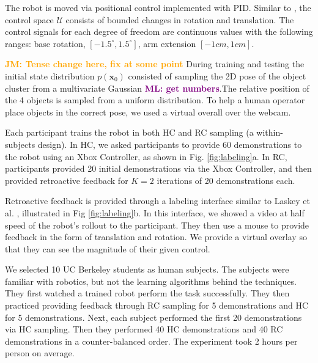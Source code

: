 \documentclass[10pt, conference]{ieeeconf}      %
\newcommand{\bx}{\mathbf{x}}
\newcommand{\mlnote}[1]{\ifthenelse{ \boolean{include-notes}}%
 {\textcolor{purple}{\textbf{ML: #1}}}{}}
\newcommand{\jmnote}[1]{\ifthenelse{ \boolean{include-notes}}%
 {\textcolor{orange}{\textbf{JM: #1}}}{}}
\begin{document}
The robot is moved via positional control implemented with PID. Similar to \cite{laskeyshiv}, the control space $\mathcal{U}$ consists of bounded changes in rotation and translation. The control signals for each degree of freedom are continuous values with the following ranges: base rotation, $[-1.5^\circ,1.5^\circ]$, arm extension $[-1cm,1cm]$.

\jmnote{Tense change here, fix at some point}
During training and testing the initial state distribution $p(\bx_0)$ consisted of sampling the 2D pose of the object cluster from a multivariate Gaussian \mlnote{get numbers}.The relative position of the 4 objects is sampled from a uniform distribution. To help a human operator place objects in the correct pose, we used a virtual overall over the webcam.   

Each participant trains the robot in both HC and RC sampling (a within-subjects design). In HC, we asked participants to provide 60 demonstrations to the robot using an Xbox Controller, as shown in Fig. \ref{fig:labeling}a. In RC, participants provided 20 initial demonstrations via the Xbox Controller, and then provided retroactive feedback for $K=2$ iterations of 20 demonstrations each.

Retroactive feedback is provided through a labeling interface similar to Laskey et al. \cite{laskeyrobot}, illustrated in Fig \ref{fig:labeling}b. In this interface, we showed a video at half speed of the robot's rollout to the participant. They then use a mouse to provide feedback in the form of translation and rotation. We provide a virtual overlay so that they can see the magnitude of their given control. 

We selected 10 UC Berkeley students as human subjects. The subjects were familiar with robotics, but not the learning algorithms behind the techniques. They first watched a trained robot perform the task successfully.  They then practiced providing feedback through RC sampling for 5 demonstrations and HC for 5 demonstrations. Next, each subject performed the first 20 demonstrations via HC sampling. Then they performed 40 HC demonstrations and 40 RC demonstrations in a counter-balanced order.  The experiment took 2 hours per person on average. 
\end{document}
